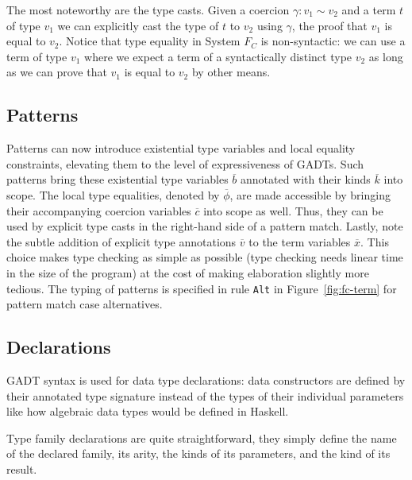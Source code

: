 The most noteworthy are the type casts. Given a coercion $\gamma : v_1 \sim v_2$
and a term $t$ of type $v_1$ we can explicitly cast the type of $t$ to
$v_2$ using $\gamma$, the proof that $v_1$ is equal to $v_2$.
Notice that type equality in System $F_C$ is non-syntactic: we can use a term
of type $v_1$ where we expect a term of a syntactically distinct type $v_2$ as
long as we can prove that $v_1$ is equal to $v_2$ by other means.

\subsection{Patterns}

Patterns can now introduce existential type variables and local equality
constraints, elevating them to the level of expressiveness of GADTs.
Such patterns bring these existential type variables $\overline{b}$ annotated
with their kinds $\overline{k}$ into scope. The local type equalities, denoted
by $\overline{\phi}$, are made accessible by bringing their accompanying
coercion variables $\overline{c}$ into scope as well. Thus, they can be used by
explicit type casts in the right-hand side of a pattern match. Lastly, note the subtle addition of explicit type
annotations $\overline{v}$ to the term variables $\overline{x}$. This choice makes
type checking as simple as possible (type checking needs linear time in the size of the program) at the cost of making elaboration
slightly more tedious. The typing of patterns is specified in rule \texttt{Alt}
in Figure~\ref{fig:fc-term} for pattern match case alternatives.

\subsection{Declarations}

GADT syntax is used for data type declarations: data constructors are defined by
their annotated type signature instead of the types of their individual
parameters like how algebraic data types would be defined in Haskell.

Type family declarations are quite straightforward, they simply define the name
of the declared family, its arity, the kinds of its parameters, and the kind of
its result.

